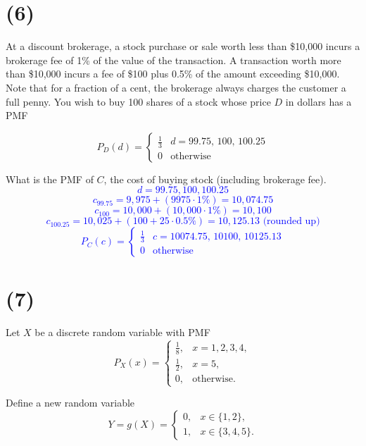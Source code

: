 \documentclass[12pt]{article}
\begin{document}
\section*{(6)}
At a discount brokerage, a stock purchase or sale worth less than \$10{,}000 incurs a brokerage fee of 1\% of the value of the transaction. A transaction worth more than \$10{,}000 incurs a fee of \$100 plus 0.5\% of the amount exceeding \$10{,}000. Note that for a fraction of a cent, the brokerage always charges the customer a full penny. You wish to buy 100 shares of a stock whose price $D$ in dollars has a PMF

\[
P_D(d) =
\begin{cases}
\tfrac{1}{3} & d = 99.75,\, 100,\, 100.25 \\
0 & \text{otherwise}
\end{cases}
\]

What is the PMF of $C$, the cost of buying stock (including brokerage fee).
\textcolor{blue}{
\[
d = 99.75, 100, 100.25
\]
\[
c_{99.75} = 9,975 + (9975\cdot 1\%) = 10,074.75
\]
\[
c_{100} = 10,000 + (10,000\cdot 1\%) = 10,100
\]
\[
c_{100.25} = 10,025 + (100+ 25\cdot0.5\%) = 10,125.13 \text{ (rounded up)}
\]
\[
P_C(c) =
\begin{cases}
\tfrac{1}{3} & c = 10074.75,\, 10100,\, 10125.13 \\
0 & \text{otherwise}
\end{cases}
\]
}

\section*{(7)}
Let $X$ be a discrete random variable with PMF
\[
P_X(x) =
\begin{cases}
\tfrac{1}{8}, & x = 1, 2, 3, 4, \\[6pt]
\tfrac{1}{2}, & x = 5, \\[6pt]
0, & \text{otherwise}.
\end{cases}
\]

Define a new random variable
\[
Y = g(X) =
\begin{cases}
0, & x \in \{1, 2\}, \\
1, & x \in \{3, 4, 5\}.
\end{cases}
\]
\end{document}
